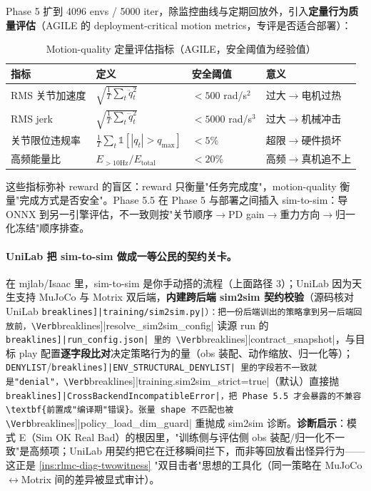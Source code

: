 Phase 5 扩到 4096 envs / 5000 iter，除监控曲线与定期回放外，引入\textbf{定量行为质量评估}（AGILE 的 deployment-critical motion metrics，专评是否适合部署）\cite{nvidia2026agile}：

\begin{table}[H]
\centering
\caption{Motion-quality 定量评估指标（AGILE，安全阈值为经验值）}
\label{tab:rlmc-diag-motionq}
\begin{tabular}{p{3.2cm}p{3.6cm}p{2.8cm}p{3.0cm}}
\hline
指标 & 定义 & 安全阈值 & 意义 \\
\hline
RMS 关节加速度 & $\sqrt{\frac1T\sum_t \ddot q_t^2}$ & $<500$ rad/s$^2$ & 过大$\to$电机过热 \\
RMS jerk & $\sqrt{\frac1T\sum_t \dddot q_t^2}$ & $<5000$ rad/s$^3$ & 过大$\to$机械冲击 \\
关节限位违规率 & $\frac1T\sum_t \mathbb{1}[|q_t|>q_{\max}]$ & $<5\%$ & 超限$\to$硬件损坏 \\
高频能量比 & $E_{>10\text{Hz}}/E_{\text{total}}$ & $<20\%$ & 高频$\to$真机追不上 \\
\hline
\end{tabular}
\end{table}

这些指标弥补 reward 的盲区：reward 只衡量"任务完成度"，motion-quality 衡量"完成方式是否安全"。Phase 5.5 在 Phase 5 与部署之间插入 sim-to-sim：导 ONNX 到另一引擎评估，不一致则按"关节顺序$\to$PD gain$\to$重力方向$\to$归一化冻结"顺序排查。

\paragraph{UniLab 把 sim-to-sim 做成一等公民的契约关卡。}在 mjlab/Isaac 里，sim-to-sim 是你手动搭的流程（上面路径 3）；UniLab 因为天生支持 MuJoCo 与 Motrix 双后端，\textbf{内建跨后端 sim2sim 契约校验}（源码核对 UniLab \Verb[breaklines]|training/sim2sim.py|）：把一份后端训出的策略拿到另一后端回放前，\Verb[breaklines]|resolve_sim2sim_config| 读源 run 的 \Verb[breaklines]|run_config.json| 里的 \Verb[breaklines]|contract_snapshot|，与目标 play 配置\textbf{逐字段比对}决定策略行为的量（obs 装配、动作缩放、归一化等）；\verb|DENYLIST|/\allowbreak\Verb[breaklines]|ENV_STRUCTURAL_DENYLIST| 里的字段若不一致就是"denial"，\Verb[breaklines]|training.sim2sim_strict=true|（默认）直接抛 \Verb[breaklines]|CrossBackendIncompatibleError|，把 Phase 5.5 才会暴露的不兼容\textbf{前置成"编译期"错误}。张量 shape 不匹配也被 \Verb[breaklines]|policy_load_dim_guard| 重抛成 sim2sim 诊断。\textbf{诊断启示}：模式 E（Sim OK Real Bad）的根因里，"训练侧与评估侧 obs 装配/归一化不一致"是高频项；UniLab 用契约把它在迁移瞬间拦下，而非等回放看出怪异行为——这正是 \cref{ins:rlmc-diag-twowitness} "双目击者"思想的工具化（同一策略在 MuJoCo$\leftrightarrow$Motrix 间的差异被显式审计）。

